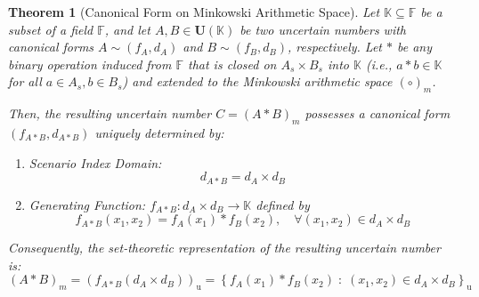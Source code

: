 \documentclass[a4paper,12pt,twoside]{memoir}
\newtheorem{theorem}{Theorem}[chapter]
\newcommand{\set}[1]{\left\{#1\right\}} %
\newcommand{\s}[1]{\set{#1}_\mathrm{u}} %
\newcommand{\bd}[1]{\left(#1\right)_\mathrm{u}} %
\newcommand{\tsbd}[1]{\mathbf{U}(\mathbb{#1})}
\newcommand{\kgdt}[1]{\left(#1\right)_m} %
\begin{document}
	\begin{theorem}[Canonical Form on Minkowski Arithmetic Space]
		\label{thm:minkowski_canonical_form}
		Let $\mathbb{K} \subseteq \mathbb{F}$ be a subset of a field $\mathbb{F}$, and let $A, B \in \tsbd{K}$ be two uncertain numbers with canonical forms $A \sim (f_A, d_A)$ and $B \sim (f_B, d_B)$, respectively. Let $*$ be any binary operation induced from $\mathbb{F}$ that is closed on $A_s \times B_s$ into $\mathbb{K}$ (i.e., $a*b \in \mathbb{K}$ for all $a \in A_s, b \in B_s$) and extended to the Minkowski arithmetic space $(\circ)_m$.
		
		Then, the resulting uncertain number $C = \kgdt{A * B}$ possesses a canonical form $(f_{A*B}, d_{A*B})$ uniquely determined by:
		\begin{enumerate}[leftmargin=*]
			\item Scenario Index Domain:
			\[
			d_{A*B} = d_A \times d_B
			\]
			\item Generating Function: $f_{A*B} : d_A \times d_B \to \mathbb{K}$ defined by
			\[
			f_{A*B}(x_1, x_2) = f_A(x_1) * f_B(x_2), \quad \forall (x_1, x_2) \in d_A \times d_B
			\]
		\end{enumerate}
		Consequently, the set-theoretic representation of the resulting uncertain number is:
		\[
		\kgdt{A * B} = \bd{f_{A*B}(d_A \times d_B)} = \s{f_A(x_1) * f_B(x_2) \;:\; (x_1, x_2) \in d_A \times d_B}
		\]
	\end{theorem}
	
\end{document}
